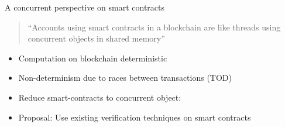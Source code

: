 
\begin{frame}{A concurrent perspective on smart 
	contracts~\cite{bib:concurrent-perspective}}

\begin{quote}
``Accounts using smart contracts in a blockchain are like threads using concurrent
objects in shared memory''
\end{quote}

\begin{itemize}
	\item Computation on blockchain \alert{deterministic}
	\item \alert{Non-determinism} due to races between transactions (TOD)
	\item Reduce smart-contracts to concurrent object:
	\item Proposal: Use existing verification techniques on smart contracts
\end{itemize}


\end{frame}
